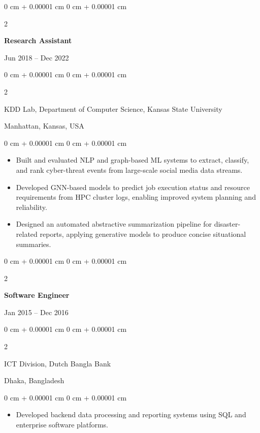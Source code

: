 \documentclass[10pt, letterpaper]{article}
\newenvironment{highlights}{
    \begin{itemize}[
        topsep=0.10 cm,
        parsep=0.10 cm,
        partopsep=0pt,
        itemsep=0pt,
        leftmargin=0 cm + 10pt
    ]
}{
    \end{itemize}
} %
\newenvironment{onecolentry}{
    \begin{adjustwidth}{
        0 cm + 0.00001 cm
    }{
        0 cm + 0.00001 cm
    }
}{
    \end{adjustwidth}
} %
\newenvironment{twocolentry}[2][]{
    \onecolentry
    \def\secondColumn{#2}
    \setcolumnwidth{\fill, 4.5 cm}
    \begin{paracol}{2}
}{
    \switchcolumn \raggedleft \secondColumn
    \end{paracol}
    \endonecolentry
} %
\begin{document}
    \vspace{1mm}
    
    \begin{twocolentry}{Jun 2018 -- Dec 2022}
        \textbf{Research Assistant}
    \end{twocolentry}
    \begin{twocolentry}{Manhattan, Kansas, USA}
       KDD Lab, Department of Computer Science, Kansas State University
    \end{twocolentry}
    \vspace{0.10 cm}
    \begin{onecolentry}
        \begin{highlights}
            \item Built and evaluated NLP and graph-based ML systems to extract, classify, and rank cyber-threat events from large-scale social media data streams.
            \item Developed GNN-based models to predict job execution status and resource requirements from HPC cluster logs, enabling improved system planning and reliability.
            \item Designed an automated abstractive summarization pipeline for disaster-related reports, applying generative models to produce concise situational summaries.
        \end{highlights}
    \end{onecolentry}

    \vspace{0.1 cm}
    \begin{twocolentry}{Jan 2015 -- Dec 2016}
        \textbf{Software Engineer}
    \end{twocolentry}
    \begin{twocolentry}{Dhaka, Bangladesh}
       ICT Division, Dutch Bangla Bank
    \end{twocolentry}
    
    \begin{onecolentry}
        \begin{highlights}
            \item Developed backend data processing and reporting systems using SQL and enterprise software platforms.
        \end{highlights}
    \end{onecolentry}
    
\end{document}
